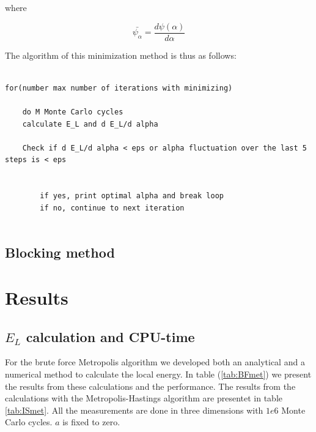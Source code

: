 \documentclass[norsk,a4paper,12pt]{article}
\begin{document}
where

\begin{equation}
	\bar{\psi_{\alpha}} = \frac{d \psi (\alpha)}{d \alpha}
\end{equation}

The algorithm of this minimization method is thus as follows:

\begin{lstlisting}

for(number max number of iterations with minimizing)
	
	do M Monte Carlo cycles
	calculate E_L and d E_L/d alpha 
	
	Check if d E_L/d alpha < eps or alpha fluctuation over the last 5 steps is < eps
	
	
		if yes, print optimal alpha and break loop
		if no, continue to next iteration


\end{lstlisting}

\subsection{Blocking method}
\label{Blocking}

\section{Results}

\subsection{$E_L$ calculation and CPU-time}\label{CPU}
For the brute force Metropolis algorithm we developed both an analytical and a numerical method to calculate the local energy. In table (\ref{tab:BFmet}) we present the results from these calculations and the performance. The results from the calculations with the Metropolis-Hastings algorithm are presentet in table \ref{tab:ISmet}. All the measurements are done in three dimensions with $1e6$ Monte Carlo cycles. $a$ is fixed to zero.
\end{document}
